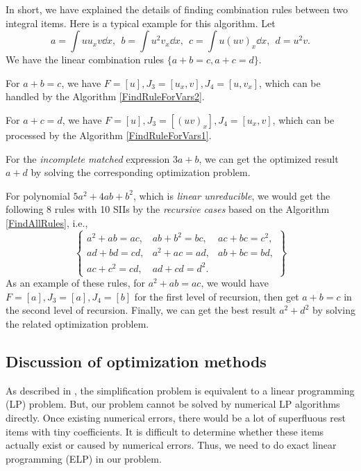 In short, we have explained the details of finding combination rules between two integral items. Here is a typical example for this algorithm. Let 
\begin{equation}
a=\int\!{uu_xv \dd x},~~b=\int\!{u^2v_x\dd x},~~c=\int\!{u(uv)_x\dd x},~~d=u^2v.
\end{equation}
We have the linear combination rules $\{a+b=c,a+c=d\}$. 

For $a+b=c$, we have $F=[u],J_3=[u_x,v],J_4=[u,v_x]$, which can be handled by the Algorithm \ref{FindRuleForVars2}.

For $a+c=d$, we have $F=[u],J_3=[(uv)_x],J_4=[u_x,v]$, which can be processed by the Algorithm \ref{FindRuleForVars1}.  

For the \emph{incomplete matched} expression $3a+b$,
we can get the optimized result $a+d$ by solving the corresponding optimization problem.

For polynomial $5a^2+4ab+b^2$, which is \emph{linear unreducible}, we would get the following 8 rules with 10 SIIs by the \emph{recursive cases} based on the Algorithm \ref{FindAllRules}, i.e., 
\begin{equation}
\left\{ 
\begin{matrix}
a^2+ab=ac, &ab+b^2=bc, &ac+bc=c^2, \\
ad+bd=cd,  &a^2+ac=ad, &ab+bc=bd,  \\ 
ac+c^2=cd, &ad+cd=d^2. &
\end{matrix}
\right\}
\end{equation}
As an example of these rules, for $a^2+ab=ac$, we would have $F=[a],J_3=[a],J_4=[b]$ for the first level of recursion, then get $a+b=c$ in the second level of recursion. Finally, we can get the best result $a^2+d^2$ by solving the related optimization problem. 

\subsection{Discussion of optimization methods}\label{optMethods-03}

As described in , the simplification problem is equivalent to a linear programming (LP) problem. But, our problem cannot be solved by numerical LP algorithms directly. Once existing numerical errors, there would be a lot of superfluous rest items with tiny coefficients. It is difficult to determine whether these items actually exist or caused by numerical errors. Thus, we need to do exact linear programming (ELP) in our problem. 

